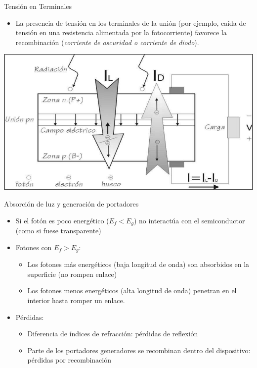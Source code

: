 \documentclass[xcolor={usenames,svgnames,dvipsnames}]{beamer}
\begin{document}
\begin{frame}[label={sec:orgd203349}]{Tensión en Terminales}
\begin{itemize}
\item La presencia de \alert{tensión en los terminales} de la unión (por ejemplo, caída de tensión en una resistencia alimentada por la fotocorriente) \alert{favorece la recombinación} (\emph{corriente de oscuridad o corriente de diodo}).
\end{itemize}

\begin{center}
\includegraphics[width=.9\linewidth]{../figs/CelulaSolar.pdf}
\end{center}
\end{frame}



\begin{frame}[label={sec:orga705a06}]{Absorción de luz y generación de portadores}
\begin{itemize}[<+->]
\item Si el \alert{fotón es poco energético} (\(E_{f}<E_{g}\)) \alert{no interactúa con el semiconductor} (como si fuese transparente)

\item Fotones con \(E_{f}>E_{g}\):
\begin{itemize}[<.->]
\item Los \alert{fotones más energéticos} (baja longitud de onda) son \alert{absorbidos en la superficie} (no rompen enlace)

\item Los \alert{fotones menos energéticos} (alta longitud de onda) penetran en el interior hasta \alert{romper un enlace}.
\end{itemize}

\item Pérdidas:
\begin{itemize}[<.->]
\item Diferencia de índices de refracción: \alert{pérdidas de reflexión}

\item Parte de los portadores generadores se recombinan dentro del dispositivo: \alert{pérdidas por recombinación}
\end{itemize}
\end{itemize}
\end{frame}
\end{document}
